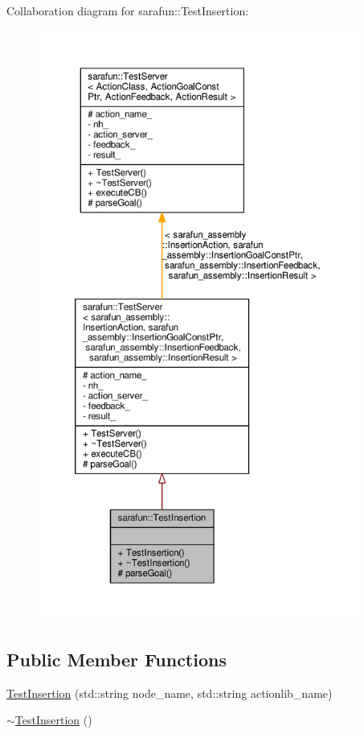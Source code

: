 Collaboration diagram for sarafun\-:\-:Test\-Insertion\-:\nopagebreak
\begin{figure}[H]
\begin{center}
\leavevmode
\includegraphics[height=550pt]{dd/de2/classsarafun_1_1TestInsertion__coll__graph}
\end{center}
\end{figure}
\subsection*{Public Member Functions}
\begin{DoxyCompactItemize}
\item 
\hyperlink{classsarafun_1_1TestInsertion_ab178b597b83fd2f91a994f99c8b46af2_ab178b597b83fd2f91a994f99c8b46af2}{Test\-Insertion} (std\-::string node\-\_\-name, std\-::string actionlib\-\_\-name)
\item 
\hyperlink{classsarafun_1_1TestInsertion_ab732dbdbceb3872ab0c23cf92d1afc37_ab732dbdbceb3872ab0c23cf92d1afc37}{$\sim$\-Test\-Insertion} ()
\end{DoxyCompactItemize}
